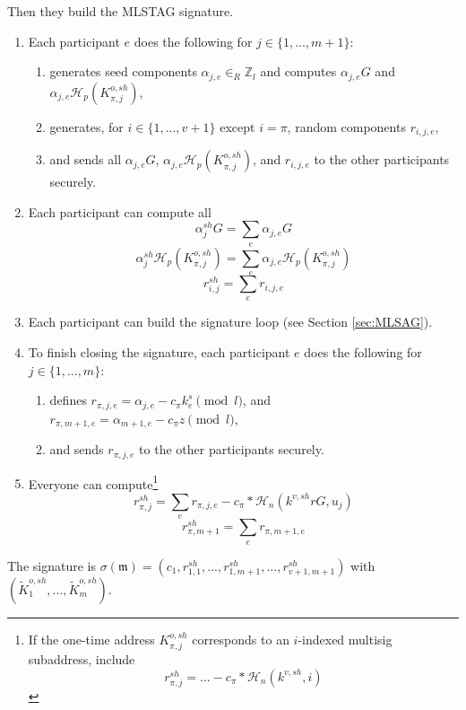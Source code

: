 Then they build the MLSTAG signature.

\begin{enumerate}
    \item Each participant $e$ does the following for $j \in \{1,...,m+1\}$:
    \begin{enumerate}
        \item generates seed components $\alpha_{j,e} \in_R \mathbb{Z}_l$ and computes $\alpha_{j,e} G$ and $\alpha_{j,e} \mathcal{H}_p(K^{o,sh}_{\pi,j})$,
        \item generates, for $i \in \{1,...,v+1\}$ except $i = \pi$, random components $r_{i,j,e}$,
        \item and sends all $\alpha_{j,e} G$, $\alpha_{j,e} \mathcal{H}_p(K^{o,sh}_{\pi,j})$, and $r_{i,j,e}$ to the other participants securely.
    \end{enumerate}
    \item Each participant can compute all
    \[ \alpha^{sh}_{j} G = \sum_e \alpha_{j,e} G\]
    \[ \alpha^{sh}_{j} \mathcal{H}_p(K^{o,sh}_{\pi,j}) = \sum_e \alpha_{j,e} \mathcal{H}_p(K^{o,sh}_{\pi,j})\]
    \[ r^{sh}_{i,j} = \sum_e r_{i,j,e}\]
    \item Each participant can build the signature loop (see Section \ref{sec:MLSAG}).
    \item To finish closing the signature, each participant $e$ does the following for $j \in \{1,...,m\}$:
    \begin{enumerate}
        \item defines $r_{\pi,j,e} = \alpha_{j,e} - c_{\pi} k^{s}_e \pmod l$, and $r_{\pi,m+1,e} = \alpha_{m+1,e} - c_{\pi} z \pmod l$,
        \item and sends $r_{\pi,j,e}$ to the other participants securely.
    \end{enumerate}
    \item Everyone can compute\footnote{If the one-time address $K^{o,sh}_{\pi,j}$ corresponds to an $i$-indexed multisig subaddress, include
    \[ r^{sh}_{\pi,j} = ... - c_{\pi}*\mathcal{H}_n(k^{v,sh},i)\]}
    \[ r^{sh}_{\pi,j} = \sum_e r_{\pi,j,e} - c_{\pi}*\mathcal{H}_n(k^{v,sh} r G, u_j) \]
    \[ r^{sh}_{\pi,m+1} = \sum_e r_{\pi,m+1,e} \]
\end{enumerate}

The signature is $\sigma(\mathfrak{m}) = (c_1,r^{sh}_{1,1},...,r^{sh}_{1,m+1},...,r^{sh}_{v+1,m+1})$ with $(\tilde{K}^{o,sh}_1, ..., \tilde{K}^{o,sh}_m)$.

